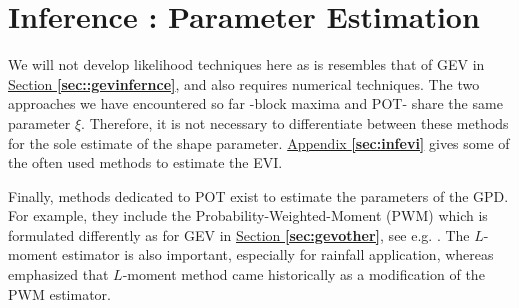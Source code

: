 \section{Inference : Parameter Estimation}\label{sec::potinfernce} 

We will not develop likelihood techniques here as is resembles that of GEV in \hyperref[sec::gevinfernce]{Section \textbf{\ref{sec::gevinfernce}}}, and also requires numerical techniques. 
The two approaches we have encountered so far -block maxima and POT- share the same parameter $\xi$. Therefore, it is not necessary to differentiate between these methods for the sole estimate of the shape parameter. \hyperref[sec:infevi]{Appendix \textbf{\ref{sec:infevi}}} gives some of the often used methods to estimate the EVI.

Finally, methods dedicated to POT exist to estimate the parameters of the GPD. For example, they include the Probability-Weighted-Moment (PWM) which is formulated differently as for GEV in \hyperref[sec:gevother]{Section \textbf{\ref{sec:gevother}}}, see e.g. 
\citet{ribereau_skew_2016}. The $L$-moment estimator is also important, especially for rainfall application, whereas \cite{hosking_regional_1997} emphasized that $L$-moment method came historically as a modification of the PWM estimator.



